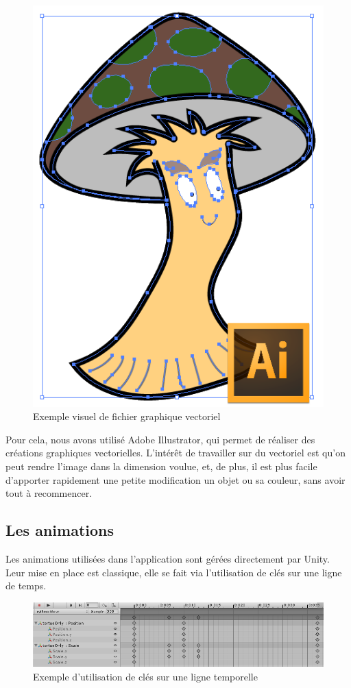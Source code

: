 \begin{figure}[H]\centering
  \includegraphics[scale=.6]{./img/technique_graphismes.png}
  \caption{Exemple visuel de fichier graphique vectoriel}
\end{figure}

Pour cela, nous avons utilisé Adobe Illustrator, qui permet de réaliser des créations graphiques vectorielles. L'intérêt de travailler sur du vectoriel est qu'on peut rendre l'image dans la dimension voulue, et, de plus, il est plus facile d'apporter rapidement une petite modification un objet ou sa couleur, sans avoir tout à recommencer.

\subsection{Les animations}
\label{anims}
Les animations utilisées dans l'application sont gérées directement par Unity. Leur mise en place est classique, elle se fait via l'utilisation de clés sur une ligne de temps. 

\begin{figure}[H]\centering
  \includegraphics[scale=.55]{./img/technique_animation1.png}
  \caption{Exemple d'utilisation de clés sur une ligne temporelle}
  \label{technique_animation1}
\end{figure}

